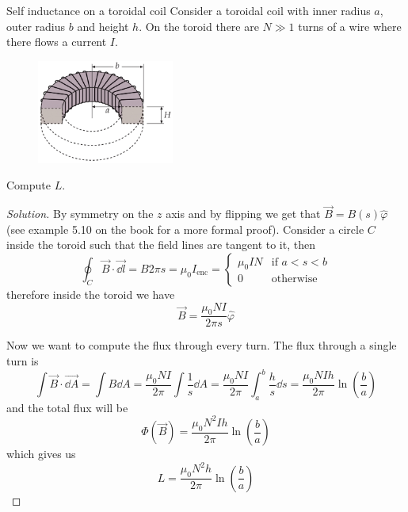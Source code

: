 \documentclass[12pt]{extarticle}
\begin{document}
\begin{example}{Self inductance on a toroidal coil}{}
	Consider a toroidal coil with inner radius $a$, outer radius $b$ and height $h$.
	On the toroid there are $N \gg 1$ turns of a wire where there flows a current $I$.

	\begin{figure}[H]
		\centering
		\includegraphics[width=0.4\textwidth]{assets/physics-2/toroidal-coil.jpg}
	\end{figure}

	Compute $L$.
\end{example}

\begin{proof}[Solution]
	By symmetry on the $z$ axis and by flipping we get that $\vec B = B(s) \hat \varphi$
	(see example 5.10 on the book for a more formal proof).
	Consider a circle $C$ inside the toroid such that the field lines are tangent to it,
	then
	\begin{equation}
		\oint_C \vec B \cdot \vec{\dd l} = B 2 \pi s = \mu_0 I_\text{enc} =
		\begin{cases}
			\mu_0 I N & \text{if } a < s < b \\
			0         & \text{otherwise}
		\end{cases}
	\end{equation}
	therefore inside the toroid we have
	\begin{equation}
		\vec B = \frac{\mu_0 N I}{2 \pi s} \hat \varphi
	\end{equation}

	Now we want to compute the flux through every turn.
	The flux through a single turn is
	\begin{equation}
		\int \vec B \cdot \vec{\dd A} = \int B \dd{A} = \frac{\mu_0 N I}{2 \pi} \int \frac{1}{s} \dd A
		= \frac{\mu_0 N I}{2 \pi} \int_a^b \frac{h}{s} \dd s
		= \frac{\mu_0 N I h}{2 \pi} \ln \left( \frac{b}{a} \right)
	\end{equation}
	and the total flux will be
	\begin{equation}
		\Phi(\vec B) = \frac{\mu_0 N^2 I h}{2 \pi} \ln \left( \frac{b}{a} \right)
	\end{equation}
	which gives us
	\begin{equation}
		L = \frac{\mu_0 N^2 h}{2 \pi} \ln \left(\frac{b}{a}\right)
	\end{equation}
\end{proof}
\end{document}

